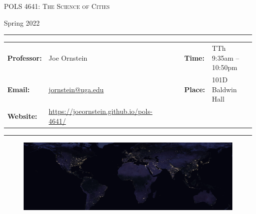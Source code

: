 \documentclass[11pt, letterpaper]{article}
\begin{document}
\begin{center}
{\Large \textsc{POLS 4641: The Science of Cities}}
\end{center}
\begin{center}
{\large Spring 2022}
\end{center}

\begin{center}
\rule{6.5in}{0.4pt}
\begin{minipage}[t]{.96\textwidth}
\begin{tabular}{llcccll}
\textbf{Professor:} & Joe Ornstein & & &  & \textbf{Time:} & TTh 9:35am -- 10:50pm \\
\textbf{Email:} &  \href{mailto:jornstein@uga.edu}{jornstein@uga.edu} & & & & \textbf{Place:} & 101D Baldwin Hall\\
\textbf{Website:} & \href{https://joeornstein.github.io/pols-4641/}{https://joeornstein.github.io/pols-4641/} & & & & &
\end{tabular}
\end{minipage}
\rule{6.5in}{0.4pt}
\end{center}
\vspace{.15cm}
\setlength{\unitlength}{1in}
\renewcommand{\arraystretch}{2}

\begin{figure}[h]
	\centering
	\includegraphics[width = 1.03\textwidth]{img/night-lights-cropped.jpg}
\end{figure}


\onehalfspacing

\end{document}
